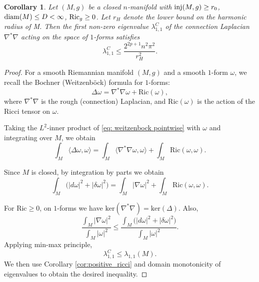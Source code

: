 \documentclass[10 pt, reqno]{amsart}
\newtheorem{corollary}[theorem]{Corollary}
\begin{document}
\begin{corollary} \label{cor:connectionLap}
    Let $(M,g)$ be a closed $n$-manifold with ${\rm inj}(M,g) \ge r_0$, ${\rm diam}(M) \le D <\infty$, $ {\rm Ric}_g \ge 0$. Let $r_H$ denote the lower bound on the harmonic radius of M. Then the first non-zero eigenvalue $\lambda^C_{1,1}$ of the connection Laplacian $\nabla^{*} \nabla$ acting on the space of $1$-forms satisfies
   \[ \lambda_{1,1}^C\le \frac{2^{2p+1}n^2\pi^2}{r_H^2}.\]
\end{corollary}
\begin{proof} For a smooth Riemannian manifold $(M,g)$ and a smooth $1$-form $\omega$, we recall the Bochner (Weitzenb\"ock) formula for $1$-forms:
\begin{equation}
\label{eq: weitzenbock pointwise}
\Delta \omega
=
\nabla^{*}\nabla \omega
+
\mathrm{Ric}(\omega),
\end{equation}
where $\nabla^{*}\nabla$ is the rough (connection) Laplacian, and $\mathrm{Ric}(\omega)$ is the action of the Ricci tensor on $\omega$.

Taking the $L^2$-inner product of \eqref{eq: weitzenbock pointwise} with $\omega$  and integrating over $M$, we obtain
\[
\int_M \langle \Delta \omega , \omega \rangle
=
\int_M \langle \nabla^{*}\nabla \omega , \omega \rangle
+
\int_M \mathrm{Ric}(\omega,\omega).
\]

Since $M$ is closed, by integration by parts we obtain
\begin{equation*}
\int_M \bigl( |d \omega|^2 +  |\delta \omega|^2\bigr)
=
\int_M |\nabla \omega|^2
+
\int_M \mathrm{Ric}(\omega,\omega).
\end{equation*}

For $\mathrm{Ric}\ge 0$, on $1$-forms we have $\mathrm{ker}(\nabla^*\nabla)=\mathrm{ker}(\Delta)$. Also,
\begin{equation*}
   \frac{\int_M |\nabla \omega|^2}{\int_M |\omega|^2}\le \frac{\int_M \bigl( |d \omega|^2 +  |\delta \omega|^2\bigr)}{\int_M | \omega|^2 }.
\end{equation*}
Applying min-max principle,
\[\lambda_{1,1}^C\le \lambda_{1,1}(M).\]
We then use Corollary \ref{cor:positive_ricci} and domain monotonicity of eigenvalues to obtain the desired inequality.
\end{proof}
\end{document}
